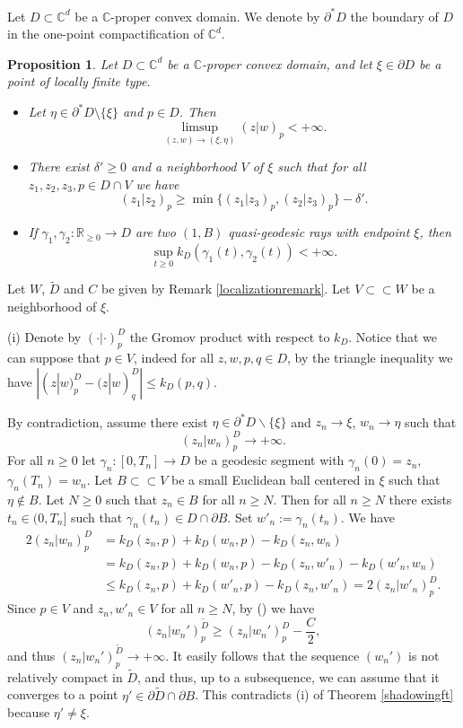\documentclass[11pt, reqno]{amsart}
\numberwithin{equation}{section}
\newtheorem{proposition}[theorem]{Proposition}
\theoremstyle{definition}
\newcommand{\C}{\mathbb{C}}
\newcommand{\R}{\mathbb{R}}
\begin{document}
	
	
	Let $D\subset\C^d$ be a $\C$-proper convex domain. We denote by $\partial^*D$ the boundary of $D$ in the one-point compactification of $\C^d$.
	\begin{proposition}\label{shadowing}
		Let $D\subset \C^d$ be a $\C$-proper convex domain, and let $\xi\in \partial D$ be a point of locally finite type.
		\begin{itemize}
			\item[(i)]
			Let $\eta\in \partial^* D\setminus\{\xi\}$ and $p\in D$. Then 
			$$\limsup_{(z,w)\to(\xi,\eta)}(z|w)_p<+\infty.$$
			
			\item[(ii)] \label{4pointloc}  There exist $\delta'\geq 0$ and a neighborhood $V$ of $\xi$ such that  for all $z_1,z_2,z_3,p\in D\cap V$ we have
			$$(z_1|z_2)_p\geq\min\{(z_1|z_3)_p,(z_2|z_3)_p\}-\delta'.$$
			
			
			
			\item[(iii)]   If $\gamma_1,\gamma_2\colon \R_{\geq 0}\to D$ are two $(1,B)$ quasi-geodesic rays with endpoint $\xi$, then
			$$\sup_{t\geq0}k_D(\gamma_1(t),\gamma_2(t))<+\infty.$$
		\end{itemize}
	\end{proposition}
	\proof
	Let $W$, $\tilde{D}$ and $C$ be given by Remark \ref{localizationremark}. Let $V\subset \subset W$ be a neighborhood of $\xi$.
	
	(i)  
	Denote  by $(\cdot|\cdot)^D_p$   the Gromov product with respect to $k_D$.
	Notice that we can suppose that $p\in V$, indeed for all $z,w,p,q\in D$, by the triangle inequality we have $|(z|w)^D_p-(z|w)^D_q|\leq k_D(p,q)$.
	
	By contradiction,  assume there exist $\eta\in\partial^* D\backslash\{\xi\}$ and $z_n\to\xi$, $w_n\to\eta$ such that
	$$(z_n|w_n)^D_p\to+\infty.$$
	For all $n\geq 0$  let  $\gamma_n\colon [0,T_n]\to D$ be a  geodesic segment with $\gamma_n(0)=z_n$, $\gamma_n(T_n)=w_n$. Let $B\subset \subset V$ be a small Euclidean ball centered in $\xi$ such that  $\eta\notin B$. 
	Let $N\geq 0$ such that $z_n\in B$ for all $n\geq N$. Then for all $n\geq N$
	there exists $t_n\in(0,T_n]$ such that $\gamma_n(t_n)\in D\cap \partial B$. Set $w'_n:=\gamma_n(t_n)$. We have
	\begin{align*}
		2(z_n|w_n)^D_p&=k_D(z_n,p)+k_D(w_n,p)-k_D(z_n,w_n)\\&=k_D(z_n,p)+k_D(w_n,p)-k_D(z_n,w'_n)-k_D(w'_n,w_n)\\&\leq k_D(z_n,p)+k_D(w'_n,p)-k_D(z_n,w'_n)=2(z_n|w'_n)^D_p.
	\end{align*}
	Since $p\in V$ and $z_n,w'_n\in V$ for all $n\geq N$, by () we have
	$$(z_n|w_n')^{\tilde{D}}_p\geq (z_n|w_n')^D_p-\frac{C}{2},$$
	and thus $(z_n|w_n')^{\tilde{D}}_p\to+\infty.$
	It easily follows that the sequence $(w_n')$ is not relatively compact in $\tilde D$, and thus, up to a subsequence, we can assume that it converges to a point $\eta'\in \partial\tilde{D}\cap\partial B$. This contradicts (i) of Theorem \ref{shadowingft} because $\eta'\neq\xi$.
	
\end{document}
